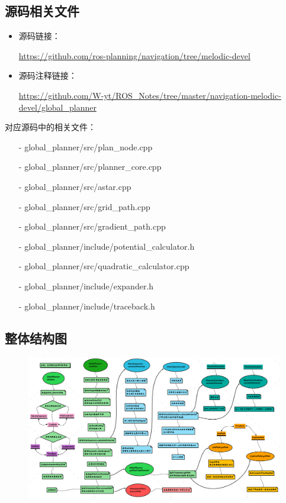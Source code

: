 \documentclass[9pt, oneside]{book}
\begin{document}


\subsection{源码相关文件}

\begin{itemize}
    \item 源码链接：
    
    \url{https://github.com/ros-planning/navigation/tree/melodic-devel}

    \item 源码注释链接：
    
    \small
    \url{https://github.com/W-yt/ROS_Notes/tree/master/navigation-melodic-devel/global_planner}
    \normalsize
\end{itemize}

对应源码中的相关文件：

\begin{itemize}
    \item [-] global\_planner/src/plan\_node.cpp
    \item [-] global\_planner/src/planner\_core.cpp
    \item [-] global\_planner/src/astar.cpp
    \item [-] global\_planner/src/grid\_path.cpp
    \item [-] global\_planner/src/gradient\_path.cpp
    \item [-] global\_planner/include/potential\_calculator.h
    \item [-] global\_planner/src/quadratic\_calculator.cpp
    \item [-] global\_planner/include/expander.h
    \item [-] global\_planner/include/traceback.h
\end{itemize}

\subsection{整体结构图}

\begin{figure}[H]
    \centering
    \includegraphics[width=1.0\linewidth]{image/global_planner.png}
\end{figure}
\end{document}
